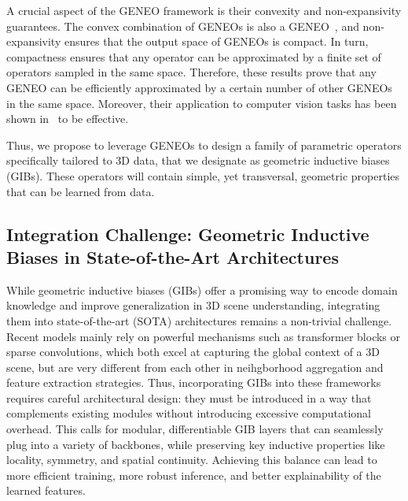 A crucial aspect of the GENEO framework is their convexity and non-expansivity
guarantees. The convex combination of GENEOs is also a
GENEO~\cite{bergomi2019towards}, and non-expansivity ensures that the output
space of GENEOs is compact.
%
In turn, compactness ensures that any operator can be approximated by a finite
set of operators sampled in the same space.
%
Therefore, these results prove that any GENEO can be efficiently approximated
by a certain number of other GENEOs in the same space.
%
Moreover, their application to computer vision tasks has been shown
in~\cite{bergomi2019towards,bocchi2022geneonet} to be effective.

Thus, we propose to leverage GENEOs to design a family of parametric operators
specifically tailored to 3D data, that we designate as geometric inductive
biases (GIBs). These operators will contain simple, yet transversal, geometric
properties that can be learned from data.
%

\subsection{Integration Challenge: Geometric Inductive Biases in State-of-the-Art Architectures}
%
While geometric inductive biases (GIBs) offer a promising way to encode domain
knowledge and improve generalization in 3D scene understanding, integrating
them into state-of-the-art (SOTA) architectures remains a non-trivial
challenge.
%
Recent models mainly rely on powerful mechanisms such as transformer blocks or
sparse convolutions, which both excel at capturing the global context of a 3D
scene, but are very different from each other in neihgborhood aggregation and
feature extraction strategies.
%
Thus, incorporating GIBs into these frameworks requires careful architectural
design: they must be introduced in a way that complements existing modules
without introducing excessive computational overhead. This calls for modular,
differentiable GIB layers that can seamlessly plug into a variety of backbones,
while preserving key inductive properties like locality, symmetry, and spatial
continuity.
%
Achieving this balance can lead to more efficient training, more robust
inference, and better explainability of the learned features.

